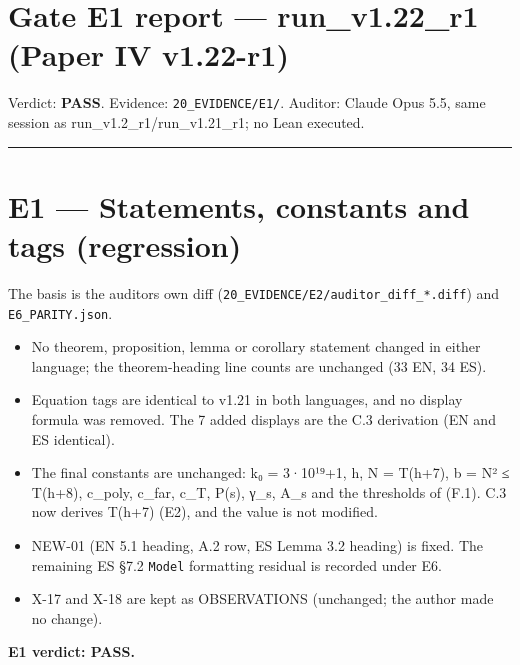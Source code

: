 \documentclass[
]{article}
\author{}
\date{}
\providecommand{\tightlist}{%
  \setlength{\itemsep}{0pt}\setlength{\parskip}{0pt}}
\begin{document}
\section{Gate E1 report --- run\_v1.22\_r1 (Paper IV
v1.22-r1)}\label{gate-e1-report--run_v122_r1-paper-iv-v122-r1}

Verdict: \textbf{PASS}. Evidence: \texttt{20\_EVIDENCE/E1/}. Auditor:
Claude Opus 5.5, same session as run\_v1.2\_r1/run\_v1.21\_r1; no Lean
executed.

\begin{center}\rule{0.5\linewidth}{0.5pt}\end{center}

\section{E1 --- Statements, constants and tags
(regression)}\label{e1--statements-constants-and-tags-regression}

The basis is the auditor\textquotesingle s own diff
(\texttt{20\_EVIDENCE/E2/auditor\_diff\_*.diff}) and
\texttt{E6\_PARITY.json}.

\begin{itemize}
\tightlist
\item
  No theorem, proposition, lemma or corollary statement changed in
  either language; the theorem-heading line counts are unchanged (33 EN,
  34 ES).
\item
  Equation tags are identical to v1.21 in both languages, and no display
  formula was removed. The 7 added displays are the C.3 derivation (EN
  and ES identical).
\item
  The final constants are unchanged: k₀ = 3·10¹⁹+1, h, N = T(h+7), b =
  N² ≤ T(h+8), c\_poly, c\_far, c\_T, P(s), γ\_s, A\_s and the
  thresholds of (F.1). C.3 now derives T(h+7) (E2), and the value is not
  modified.
\item
  NEW-01 (EN 5.1 heading, A.2 row, ES Lemma 3.2 heading) is fixed. The
  remaining ES §7.2 \texttt{Model} formatting residual is recorded under
  E6.
\item
  X-17 and X-18 are kept as OBSERVATIONS (unchanged; the author made no
  change).
\end{itemize}

\textbf{E1 verdict: PASS.}
\end{document}

